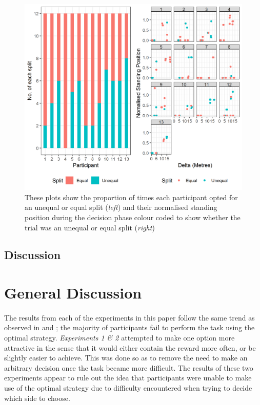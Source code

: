 \documentclass[12pt]{article}
\begin{document}
\begin{figure}[ht!]%
	\includegraphics[scale=0.9]{Figures/Experiment_5_Unequal_Reward/prop_and_position}
	\centering
	\captionsetup{justification=centering}
	\caption{These plots show the proportion of times each participant opted for an unequal or equal split (\textit{left}) and their normalised standing position during the decision phase colour coded to show whether the trial was an unequal or equal split (\textit{right})}
	\label{fig:DecisionPhase_Reward}
\end{figure}

\subsection*{Discussion}


\section*{General Discussion}
\paragraph{} The results from each of the experiments in this paper follow the same trend as observed in \cite{clarke2015failure} and \cite{James2017}; the majority of participants fail to perform the task using the optimal strategy. \textit{Experiments 1 \& 2} attempted to make one option more attractive in the sense that it would either contain the reward more often, or be slightly easier to achieve. This was done so as to remove the need to make an arbitrary decision once the task became more difficult. The results of these two experiments appear to rule out the idea that participants were unable to make use of the optimal strategy due to difficulty encountered when trying to decide which side to choose. 
\end{document}

